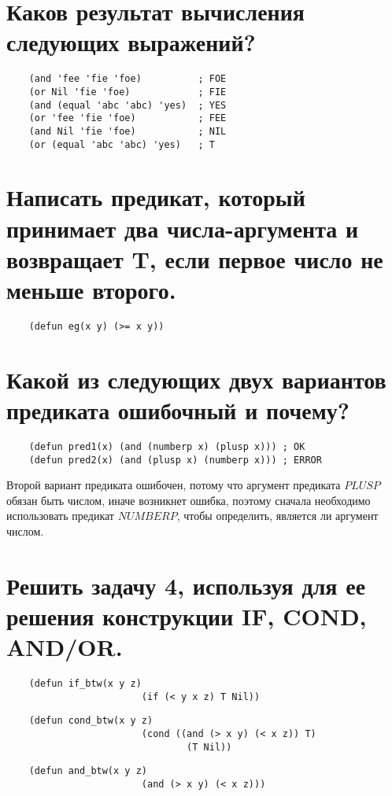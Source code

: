\documentclass[12pt]{report}
\begin{document}
\section{Каков результат вычисления следующих выражений?}

\begin{lstlisting}
	(and 'fee 'fie 'foe)          ; FOE
	(or Nil 'fie 'foe)            ; FIE
	(and (equal 'abc 'abc) 'yes)  ; YES 
	(or 'fee 'fie 'foe)           ; FEE
	(and Nil 'fie 'foe)           ; NIL
	(or (equal 'abc 'abc) 'yes)   ; T
\end{lstlisting}

\section{Написать предикат, который принимает два числа-аргумента и возвращает T, если первое число не меньше второго.}

\begin{lstlisting}
	(defun eg(x y) (>= x y))
\end{lstlisting}

\section{Какой из следующих двух вариантов предиката ошибочный и почему?}

\begin{lstlisting}
	(defun pred1(x) (and (numberp x) (plusp x))) ; OK
	(defun pred2(x) (and (plusp x) (numberp x))) ; ERROR
\end{lstlisting}

Второй вариант предиката ошибочен, потому что аргумент предиката $PLUSP$ обязан быть числом, иначе возникнет ошибка, поэтому сначала необходимо использовать предикат $NUMBERP$, чтобы определить, является ли аргумент числом.

\section{Решить задачу 4, используя для ее решения конструкции IF, COND, AND/OR.}

\begin{lstlisting}
	(defun if_btw(x y z) 
						(if (< y x z) T Nil))
\end{lstlisting}
\begin{lstlisting}	
	(defun cond_btw(x y z) 
						(cond ((and (> x y) (< x z)) T) 
							  	(T Nil))
\end{lstlisting}
\begin{lstlisting}
	(defun and_btw(x y z) 
						(and (> x y) (< x z)))
\end{lstlisting}
\end{document}
